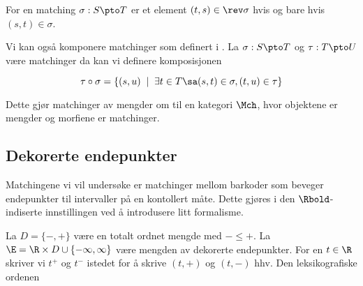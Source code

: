 \begin{definition}\label{Def:rev}
	For en matching $\sigma: S\pto T$ er et element $(t,s)\in\rev\sigma$ hvis og bare hvis $(s,t)\in\sigma$.
\end{definition}

Vi kan også komponere matchinger som definert i \cite{Bauer2015a}. La $\sigma: S\pto T$ og $\tau: T\pto U$ være matchinger da kan vi definere komposisjonen

\[\tau\circ\sigma = \{(s,u)\;\mid\; \exists t\in T\sa (s,t)\in\sigma, (t,u)\in\tau\}\]

Dette gjør matchinger av mengder om til en kategori $\Mch$, hvor objektene er mengder og morfiene er matchinger.

\subsection{Dekorerte endepunkter}
Matchingene vi vil undersøke er matchinger mellom barkoder som beveger endepunkter til intervaller på en kontollert måte. Dette gjøres i den $\Rbold$-indiserte innstillingen ved å introdusere litt formalisme.

La $D = \{-,+\}$ være en totalt ordnet mengde med $-\leq+$. La $\E = \R\times D\cup\{-\infty,\infty\}$ være mengden av dekorerte endepunkter. For en $t\in\R$ skriver vi $t^+$ og $t^-$ istedet for å skrive $(t,+)$ og $(t,-)$ hhv. Den leksikografiske ordenen